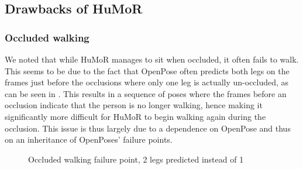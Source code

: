 \subsection{Drawbacks of HuMoR}

\subsubsection{Occluded walking}
We noted that while HuMoR manages to sit when occluded, it often fails to walk. This seems to be due to the fact that OpenPose \cite{openPose} often predicts both legs on the frames just before the occlusions where only one leg is actually un-occluded, as can be seen in . This results in a sequence of poses where the frames before an occlusion indicate that the person is no longer walking, hence making it significantly more difficult for HuMoR to begin walking again during the occlusion. This issue is thus largely due to a dependence on OpenPose and thus on an inheritance of OpenPoses' failure points.

\begin{figure}[!ht]
    \centering
    \hfil
    \hfil
    \caption{Occluded walking failure point, 2 legs predicted instead of 1}
    \label{fig:humor_bad_occluded_walking}
\end{figure}

